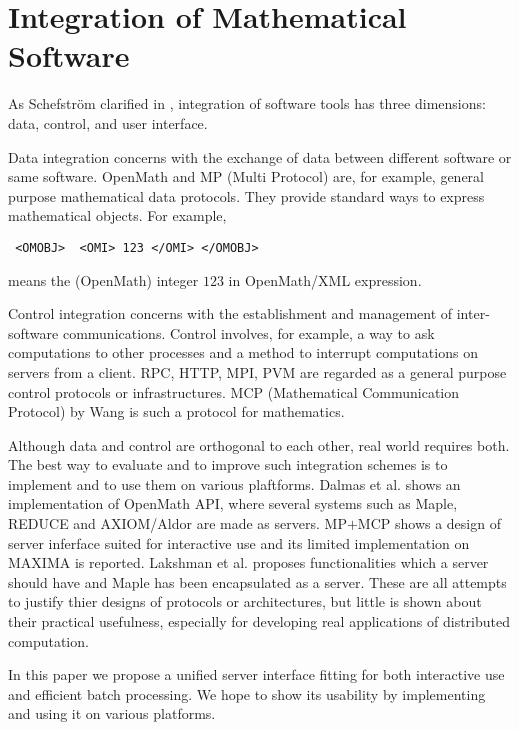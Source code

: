
\section{Integration of Mathematical Software} 

As Schefstr\"om clarified in \cite{schefstrom},
integration of software tools has three dimensions:
data, control, and user interface.

Data integration concerns with the exchange of data between different
software or same software.
OpenMath \cite{OpenMath} and MP (Multi Protocol) \cite{GKW} are,
for example, general purpose mathematical data protocols.
They provide standard ways to express mathematical objects.
For example,
\begin{verbatim}
 <OMOBJ>  <OMI> 123 </OMI> </OMOBJ>
\end{verbatim}
means the (OpenMath) integer $123$ in OpenMath/XML expression.

Control integration concerns with the establishment and management of
inter-software communications.
Control involves, for example, a way to ask computations to other processes
and a method to interrupt computations on servers from a client.
RPC, HTTP, MPI, PVM are regarded as a general purpose control protocols or
infrastructures.
MCP (Mathematical Communication Protocol)
by Wang \cite{iamc} is such a protocol for mathematics.

Although data and control are orthogonal to each other, real world
requires both. The best way to evaluate and to improve such
integration schemes is to implement and to use them on various
plaftforms.  Dalmas et al. \cite{omimp} shows an implementation of
OpenMath API, where several systems such as Maple, REDUCE and
AXIOM/Aldor are made as servers.  MP$+$MCP \cite{iamc} shows a design
of server inferface suited for interactive use and its limited
implementation on MAXIMA is reported.  Lakshman et al. \cite{pseware}
proposes functionalities which a server should have and Maple has been
encapsulated as a server. These are all attempts to justify thier
designs of protocols or architectures, but little is shown about their
practical usefulness, especially for developing real applications of
distributed computation.

In this paper we propose a unified server interface fitting for both
interactive use and efficient batch processing. We hope to show its
usability by implementing and using it on various platforms.

